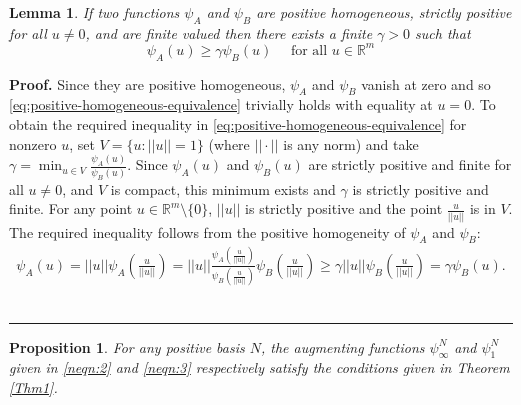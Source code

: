 \documentclass[preprint, 1p, review]{elsarticle}
\newtheorem{lemma}[theorem]{Lemma}
\newtheorem{proposition}[theorem]{Proposition}
\newenvironment{proof}[1][Proof]{\noindent\textbf{#1.} }{\ \rule{0.5em}{0.5em}}
\begin{document}
\begin{lemma}\label{lemma:positive-homogeneous-equivalence}If two functions $\psi_A$ and $\psi_B$ are positive homogeneous, strictly positive for all $u \neq 0$, and are finite valued then there exists a finite $\gamma > 0$ such that
	\begin{equation}\label{eq:positive-homogeneous-equivalence}
	\psi_A(u) \geq \gamma \psi_B(u) \quad \text{ for all  } u\in \mathbb{R}^{m}
	\end{equation}
\end{lemma}

\begin{proof}
Since they are positive homogeneous, $\psi_A$ and $\psi_B$ vanish at zero and so \eqref{eq:positive-homogeneous-equivalence} trivially holds with equality at $u=0$.
To obtain the required inequality in \eqref{eq:positive-homogeneous-equivalence} for nonzero $u$, set $V = \{ u : ||u|| = 1\}$ (where $||\cdot||$ is any norm) and take $\gamma = \min_{u \in V} \frac{\psi_A(u)}{\psi_B(u)}$. Since $\psi_A(u)$ and $\psi_B(u)$ are strictly positive and finite for all $u \neq 0$, and $V$ is compact, this minimum exists and $\gamma$ is strictly positive and finite. For any point $u \in \mathbb{R}^{m} \setminus \{0\}$, $||u||$ is strictly positive and the point $\frac{u}{||u||}$ is in $V$. The required inequality follows from the positive homogeneity of $\psi_A$ and $\psi_B$:
\begin{multline*}
\psi_A(u) = {||u||} \psi_A\left(\frac{u}{{||u||}}\right) = {||u||} \frac{\psi_A\left(\frac{u}{||u||} \right)}{\psi_B\left(\frac{u}{||u||} \right)} \psi_B\left(\frac{u}{||u||} \right) \geq \gamma{||u||} \psi_B\left(\frac{u}{||u||} \right) = \gamma \psi_B\left(u\right).
\end{multline*}
\end{proof}
 
\begin{proposition}\label{pospen}
	For any positive basis $N$, the augmenting functions $\psi_{\infty}^N$ and $\psi_{1}^N$ given in \eqref{neqn:2} and \eqref{neqn:3} respectively satisfy the conditions given in Theorem \ref{Thm1}.
\end{proposition}
\end{document}
